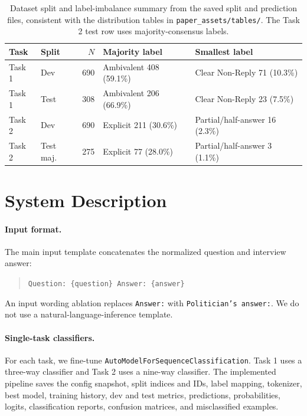 \documentclass[11pt,twocolumn]{article}
\newcommand{\taskone}{Task 1}
\newcommand{\tasktwo}{Task 2}
\begin{document}
\begin{table}[t]
\centering
\scriptsize
\begin{tabularx}{\columnwidth}{llrXX}
\toprule
Task & Split & $N$ & Majority label & Smallest label \\
\midrule
\taskone & Dev & 690 & Ambivalent 408 (59.1\%) & Clear Non-Reply 71 (10.3\%) \\
\taskone & Test & 308 & Ambivalent 206 (66.9\%) & Clear Non-Reply 23 (7.5\%) \\
\tasktwo & Dev & 690 & Explicit 211 (30.6\%) & Partial/half-answer 16 (2.3\%) \\
\tasktwo & Test maj. & 275 & Explicit 77 (28.0\%) & Partial/half-answer 3 (1.1\%) \\
\bottomrule
\end{tabularx}
\caption{Dataset split and label-imbalance summary from the saved split and prediction files, consistent with the distribution tables in \texttt{paper\_assets/tables/}. The \tasktwo{} test row uses majority-consensus labels.}
\label{tab:data}
\end{table}

\section{System Description}

\paragraph{Input format.}
The main input template concatenates the normalized question and interview answer:
\begin{quote}
\small
\texttt{Question: \{question\} Answer: \{answer\}}
\end{quote}
An input wording ablation replaces \texttt{Answer:} with \texttt{Politician's answer:}. We do not use a natural-language-inference template.

\paragraph{Single-task classifiers.}
For each task, we fine-tune \texttt{AutoModelForSequenceClassification}. \taskone{} uses a three-way classifier and \tasktwo{} uses a nine-way classifier. The implemented pipeline saves the config snapshot, split indices and IDs, label mapping, tokenizer, best model, training history, dev and test metrics, predictions, probabilities, logits, classification reports, confusion matrices, and misclassified examples.
\end{document}
